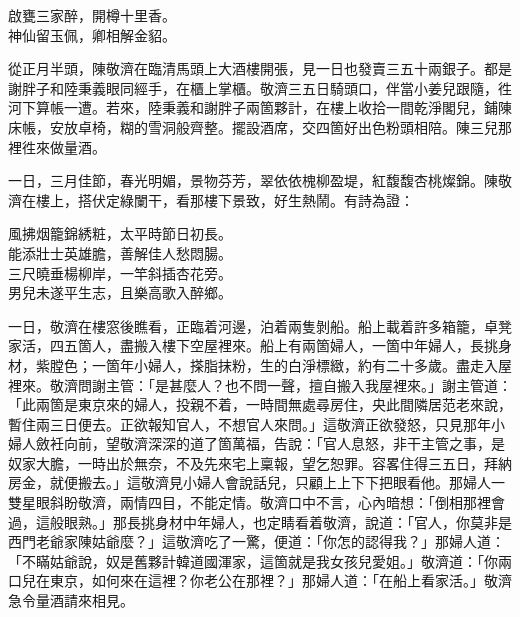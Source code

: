 \begin{myquote}
啟甕三家醉，開樽十里香。\\神仙留玉佩，卿相解金貂。
\end{myquote}

從正月半頭，陳敬濟在臨清馬頭上大酒樓開張，見一日也發賣三五十兩銀子。都是謝胖子和陸秉義眼同經手，在櫃上掌櫃。敬濟三五日騎頭口，伴當小姜兒跟隨，徃河下算帳一遭。若來，陸秉義和謝胖子兩箇夥計，在樓上收拾一間乾淨閣兒，鋪陳床帳，安放卓椅，糊的雪洞般齊整。擺設酒席，交四箇好出色粉頭相陪。陳三兒那裡徃來做量酒。

一日，三月佳節，春光明媚，景物芬芳，翠依依槐柳盈堤，紅馥馥杏桃燦錦。陳敬濟在樓上，搭伏定綠闌干，看那樓下景致，好生熱鬧。有詩為證：

\begin{myquote}
風拂烟籠錦綉粧，太平時節日初長。\\能添壯士英雄膽，善解佳人愁悶腸。\\三尺曉垂楊柳岸，一竿斜插杏花旁。\\男兒未遂平生志，且樂高歌入醉鄉。
\end{myquote}

一日，敬濟在樓窓後瞧看，正臨着河邊，泊着兩隻剝船。船上載着許多箱籠，卓凳家活，四五箇人，盡搬入樓下空屋裡來。船上有兩箇婦人，{}一箇中年婦人，長挑身材，紫膛色；一箇年小婦人，搽脂抹粉，生的白淨標緻，約有二十多歲。盡走入屋裡來。{}敬濟問謝主管：「是甚麼人？也不問一聲，擅自搬入我屋裡來。」謝主管道：「此兩箇是東京來的婦人，投親不着，一時間無處尋房住，央此間隣居范老來說，暫住兩三日便去。正欲報知官人，不想官人來問。」這敬濟正欲發怒，只見那年小婦人斂衽向前，望敬濟深深的道了箇萬福，告說：「官人息怒，非干主管之事，是奴家大膽，一時出於無奈，不及先來宅上稟報，望乞恕罪。容畧住得三五日，拜納房金，就便搬去。」這敬濟見小婦人會說話兒，只顧上上下下把眼看他。那婦人一雙星眼斜盼敬濟，兩情四目，不能定情。{}敬濟口中不言，心內暗想：「倒相那裡會過，這般眼熟。」那長挑身材中年婦人，也定睛看着敬濟，說道：「官人，你莫非是西門老爺家陳姑爺麼？」這敬濟吃了一驚，便道：「你怎的認得我？」那婦人道：「不瞞姑爺說，奴是舊夥計韓道國渾家，這箇就是我女孩兒愛姐。」敬濟道：「你兩口兒在東京，如何來在這裡？你老公在那裡？」{}那婦人道：「在船上看家活。」敬濟急令量酒請來相見。

